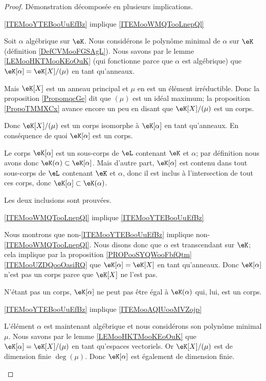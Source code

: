 \begin{proof}
    Démonstration décomposée en plusieurs implications.
    \begin{subproof}
        \item[\ref{ITEMooYTEBooUuEfBz} implique \ref{ITEMooWMQTooLnepQl}]
        
            Soit \( \alpha\) algébrique sur \( \eK\). Nous considérons le polynôme minimal de \( \alpha\) sur \( \eK\) (définition \ref{DefCVMooFGSAgL}). Nous savons par le lemme \ref{LEMooHKTMooKEoOuK} (qui fonctionne parce que \( \alpha\) est algébrique) que \( \eK[\alpha]=\eK[X]/(\mu)\) en tant qu'anneaux.

            Mais \( \eK[X]\) est un anneau principal et \( \mu\) en est un élément irréductible. Donc la proposition \ref{PropomqcGe} dit que \( (\mu)\) est un idéal maximum; la proposition \ref{PropoTMMXCx} avance encore un peu en disant que \( \eK[X]/(\mu)\) est un corps.

            Donc \( \eK[X]/(\mu)\) est un corps isomorphe à \( \eK[\alpha]\) en tant qu'anneaux. En conséquence de quoi \( \eK[\alpha]\) est un corps.

            Le corps \( \eK[\alpha]\) est un sous-corps de \( \eL\) contenant \( \eK\) et \( \alpha\); par définition nous avons donc \( \eK(\alpha)\subset \eK[\alpha]\). Mais d'autre part, \( \eK[\alpha]\) est contenu dans tout sous-corps de \( \eL\) contenant \( \eK\) et \( \alpha\), donc il est inclus à l'intersection de tout ces corps, donc \( \eK[\alpha]\subset \eK(\alpha)\).

            Les deux inclusions sont prouvées.

        \item[\ref{ITEMooWMQTooLnepQl} implique \ref{ITEMooYTEBooUuEfBz}]

            Nous montrons que non-\ref{ITEMooYTEBooUuEfBz} implique non-\ref{ITEMooWMQTooLnepQl}. Nous disons donc que \( \alpha\) est transcendant sur \( \eK\); cela implique par la proposition \ref{PROPooSYQWooFbfQtm}\ref{ITEMooUZDQooOasiRQ} que \( \eK[\alpha]=\eK[X]\) en tant qu'anneaux. Donc \( \eK[\alpha]\) n'est pas un corps parce que \( \eK[X]\) ne l'est pas.

            N'étant pas un corps, \( \eK[\alpha]\) ne peut pas être égal à \( \eK(\alpha)\) qui, lui, est un corps.

        \item[\ref{ITEMooYTEBooUuEfBz} implique \ref{ITEMooAQIUooMVZojp}]

            L'élément \( \alpha\) est maintenant algébrique et nous considérons son polynôme minimal \( \mu\). Nous savons par le lemme \ref{LEMooHKTMooKEoOuK} que \( \eK[\alpha]=\eK[X]/(\mu)\) en tant qu'espaces vectoriels. Or \( \eK[X]/(\mu)\) est de dimension finie \( \deg(\mu)\). Donc \( \eK[\alpha]\) est également de dimension finie.


\end{subproof}
\end{proof}
